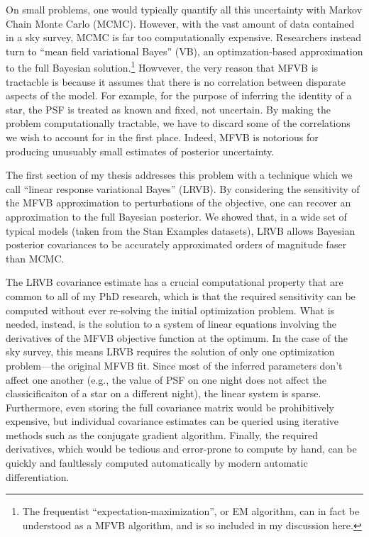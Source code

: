 On small problems, one would typically quantify all this uncertainty with Markov
Chain Monte Carlo (MCMC).  However, with the vast amount of data contained in a
sky survey, MCMC is far too computationally expensive. Researchers instead turn
to ``mean field variational Bayes'' (VB), an optimzation-based approximation to
the full Bayesian solution.\footnote{ The frequentist
``expectation-maximization'', or EM algorithm, can in fact be understood as a
MFVB algorithm, and is so included in my discussion here.} Howvever, the very
reason that MFVB is tractacble is because it assumes that there is no
correlation between disparate aspects of the model.  For example, for the
purpose of inferring the identity of a star, the PSF is treated as known and
fixed, not uncertain.  By making the problem computationally tractable, we have
to discard some of the correlations we wish to account for in the first place.
Indeed, MFVB is notorious for producing unusuably small estimates of posterior
uncertainty.

The first section of my thesis addresses this problem with a technique which we
call ``linear response variational Bayes'' (LRVB).  By considering the
sensitivity of the MFVB approximation to perturbations of the objective, one can
recover an approximation to the full Bayesian posterior.  We showed that, in a
wide set of typical models (taken from the Stan Examples datasets), LRVB allows
Bayesian posterior covariances to be accurately approximated orders of magnitude
faser than MCMC.

The LRVB covariance estimate has a crucial computational property that are
common to all of my PhD research, which is that the required sensitivity can be
computed without ever re-solving the initial optimization problem.  What is
needed, instead, is the solution to a system of linear equations involving the
derivatives of the MFVB objective function at the optimum.  In the case of the
sky survey, this means LRVB requires the solution of only one optimization
problem---the original MFVB fit.  Since most of the inferred parameters don't
affect one another (e.g., the value of PSF on one night does not affect
the classicificaiton of a star on a different night), the linear system is
sparse.  Furthermore, even storing the full covariance matrix would be
prohibitively expensive, but individual covariance estimates can be queried
using iterative methods such as the conjugate gradient algorithm.  Finally,
the required derivatives, which would be tedious and error-prone to compute
by hand, can be quickly and faultlessly computed automatically by modern
automatic differentiation.






